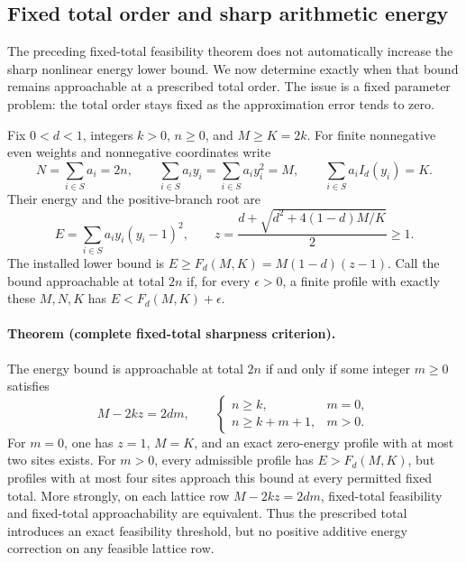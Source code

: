 \subsection{Fixed total order and sharp arithmetic energy}
\label{sec:fixed-total-energy-sharpness}

The preceding fixed-total feasibility theorem does not automatically increase
the sharp nonlinear energy lower bound.  We now determine exactly when that
bound remains approachable at a prescribed total order.  The issue is a fixed
parameter problem: the total order stays fixed as the approximation error
tends to zero.

Fix \(0<d<1\), integers \(k>0\), \(n\ge0\), and \(M\ge K=2k\).
For finite nonnegative even weights and nonnegative coordinates write
\[
 N=\sum_{i\in S}a_i=2n,\qquad
 \sum_{i\in S}a_i y_i=\sum_{i\in S}a_i y_i^2=M,\qquad
 \sum_{i\in S}a_i I_d(y_i)=K.
\]
Their energy and the positive-branch root are
\[
 E=\sum_{i\in S}a_i y_i(y_i-1)^2,\qquad
 z=\frac{d+\sqrt{d^2+4(1-d)M/K}}{2}\ge1.
\]
The installed lower bound is
\(E\ge F_d(M,K)=M(1-d)(z-1)\).
Call the bound approachable at total \(2n\) if, for every
\(\epsilon>0\), a finite profile with exactly these \(M,N,K\)
has \(E<F_d(M,K)+\epsilon\).

\paragraph{Theorem (complete fixed-total sharpness criterion).}
The energy bound is approachable at total \(2n\) if and only if some
integer \(m\ge0\) satisfies
\begin{equation}
 M-2kz=2dm,\qquad
 \begin{cases}
 n\ge k,&m=0,\\
 n\ge k+m+1,&m>0.
 \end{cases}
 \label{eq:fixed-total-energy-criterion}
\end{equation}
For \(m=0\), one has \(z=1\), \(M=K\), and an exact zero-energy
profile with at most two sites exists.  For \(m>0\), every admissible
profile has \(E>F_d(M,K)\), but profiles with at most four sites approach
this bound at every permitted fixed total.  More strongly, on each lattice
row \(M-2kz=2dm\), fixed-total feasibility and fixed-total
approachability are equivalent.  Thus the prescribed total introduces an
exact feasibility threshold, but no positive additive energy correction on
any feasible lattice row.

